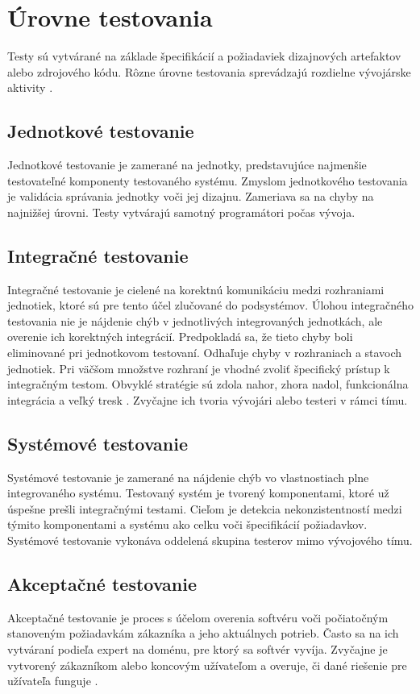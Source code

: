 \bigskip
\section{Úrovne testovania}
Testy sú vytvárané na základe špecifikácií a požiadaviek dizajnových artefaktov alebo zdrojového kódu. Rôzne úrovne testovania sprevádzajú rozdielne vývojárske aktivity \cite{Ist}.
\subsection*{Jednotkové testovanie}
Jednotkové testovanie je zamerané na jednotky, predstavujúce najmenšie testovateľné komponenty testovaného systému. Zmyslom jednotkového testovania je validácia správania jednotky voči jej dizajnu. Zameriava sa na chyby na najnižšej úrovni. Testy vytvárajú samotný programátori počas vývoja.    
\subsection*{Integračné testovanie}
Integračné testovanie je cielené na korektnú komunikáciu medzi rozhraniami jednotiek, ktoré sú pre tento účel zlučované do podsystémov. Úlohou integračného testovania nie je nájdenie chýb v jednotlivých integrovaných jednotkách, ale overenie ich korektných integrácií. Predpokladá sa, že tieto chyby boli eliminované pri jednotkovom testovaní. Odhaľuje chyby v rozhraniach a stavoch jednotiek. Pri väčšom množstve rozhraní je vhodné zvoliť špecifický prístup k integračným testom. Obvyklé stratégie sú zdola nahor, zhora nadol, funkcionálna integrácia a veľký tresk \cite{Gst}. Zvyčajne ich tvoria vývojári alebo testeri v rámci tímu.
\subsection*{Systémové testovanie}
Systémové testovanie je zamerané na nájdenie chýb vo vlastnostiach plne integrovaného systému. Testovaný systém je tvorený komponentami, ktoré už úspešne prešli integračnými testami. Cieľom je detekcia nekonzistentností medzi týmito komponentami a systému ako celku voči špecifikácií požiadavkov. Systémové testovanie vykonáva oddelená skupina testerov mimo vývojového tímu. 
\subsection*{Akceptačné testovanie}
Akceptačné testovanie je proces s účelom overenia softvéru voči počiatočným stanoveným požiadavkám zákazníka a jeho aktuálnych potrieb. Často sa na ich vytváraní podieľa expert na doménu, pre ktorý sa softvér vyvíja. Zvyčajne je vytvorený zákazníkom alebo koncovým užívateľom a overuje, či dané riešenie pre užívateľa funguje \cite{Ast}.  

